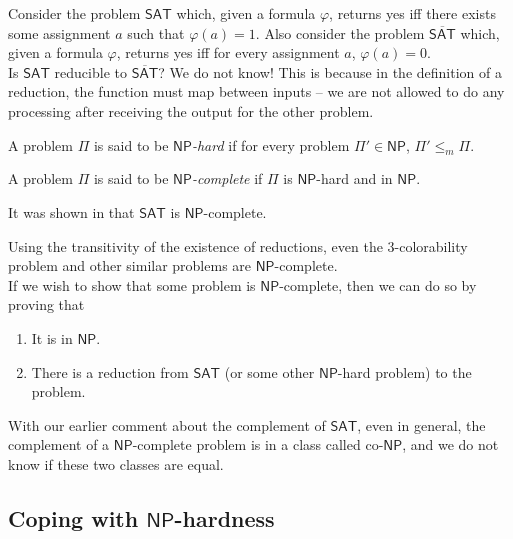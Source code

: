 	Consider the problem $\mathsf{SAT}$ which, given a formula $\varphi$, returns yes iff there exists some assignment $a$ such that $\varphi(a) = 1$. Also consider the problem $\overline{\mathsf{SAT}}$ which, given a formula $\varphi$, returns yes iff for every assignment $a$, $\varphi(a) = 0$. \\
	Is $\mathsf{SAT}$ reducible to $\overline{\mathsf{SAT}}$? We do not know! This is because in the definition of a reduction, the function must map between inputs -- we are not allowed to do any processing after receiving the output for the other problem.

	\begin{fdef}
		A problem $\mathsf{\Pi}$ is said to be \textit{$\mathsf{NP}$-hard} if for every problem $\mathsf{\Pi}' \in \mathsf{NP}$, $\mathsf{\Pi}' \leq_m \mathsf{\Pi}$.
	\end{fdef}

	\begin{fdef}
		A problem $\mathsf{\Pi}$ is said to be \textit{$\mathsf{NP}$-complete} if $\mathsf{\Pi}$ is $\mathsf{NP}$-hard and in $\mathsf{NP}$.
	\end{fdef}

	It was shown in \cite{cookSAT,levinSAT} that $\mathsf{SAT}$ is $\mathsf{NP}$-complete.

	Using the transitivity of the existence of reductions, even the $3$-colorability problem and other similar problems are $\mathsf{NP}$-complete.\\
	If we wish to show that some problem is $\mathsf{NP}$-complete, then we can do so by proving that
	\begin{enumerate}
		\item It is in $\mathsf{NP}$.
		\item There is a reduction from $\mathsf{SAT}$ (or some other $\mathsf{NP}$-hard problem) to the problem.
	\end{enumerate}

	With our earlier comment about the complement of $\mathsf{SAT}$, even in general, the complement of a $\mathsf{NP}$-complete problem is in a class called co-$\mathsf{NP}$, and we do not know if these two classes are equal.

\subsection{Coping with \texorpdfstring{$\mathsf{NP}$}{NP}-hardness}

